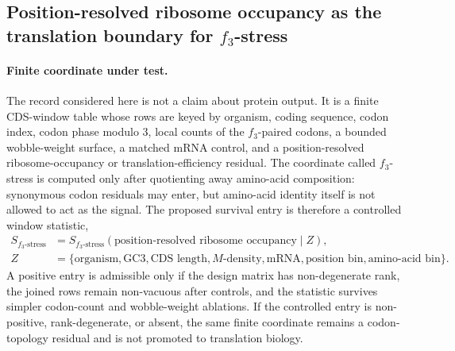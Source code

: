 \subsection{Position-resolved ribosome occupancy as the translation boundary for $f_3$-stress}
\label{subsec:q6-f3-stress-position-resolved-ribosome-occupancy-translation-boundary}

\paragraph{Finite coordinate under test.}
The record considered here is not a claim about protein output.  It is a finite CDS-window table whose rows are keyed by organism, coding sequence, codon index, codon phase modulo $3$, local counts of the $f_3$-paired codons, a bounded wobble-weight surface, a matched mRNA control, and a position-resolved ribosome-occupancy or translation-efficiency residual.  The coordinate called $f_3$-stress is computed only after quotienting away amino-acid composition: synonymous codon residuals may enter, but amino-acid identity itself is not allowed to act as the signal.  The proposed survival entry is therefore a controlled window statistic,
$$
\begin{aligned}
S_{f_3\text{-stress}} &= S_{f_3\text{-stress}}(\text{position-resolved ribosome occupancy}\mid Z),\\
Z &= \{\text{organism},\text{GC3},\text{CDS length},M\text{-density},\text{mRNA},\text{position bin},\text{amino-acid bin}\}.
\end{aligned}
$$
A positive entry is admissible only if the design matrix has non-degenerate rank, the joined rows remain non-vacuous after controls, and the statistic survives simpler codon-count and wobble-weight ablations.  If the controlled entry is non-positive, rank-degenerate, or absent, the same finite coordinate remains a codon-topology residual and is not promoted to translation biology.

